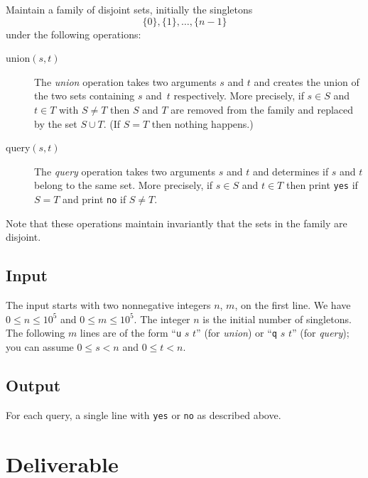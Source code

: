 \documentclass{tufte-handout}
\begin{document}
Maintain a family of disjoint sets, initially the singletons
\[ \{0\},\{1\}, \ldots,\{n-1\} \]
under the following operations:
\begin{description}
  \item[union$(s,t)$]
The \emph{union} operation takes two arguments $s$ and $t$ and creates the union of the two sets containing $s$ and~$t$ respectively.
More precisely, if $s\in S$ and $t\in T$ with $S\neq T$ then $S$ and $T$ are removed from the family and replaced by the set $S\cup T$. 
    (If $S=T$  then nothing happens.)
  \item[query$(s,t)$]
    The \emph{query} operation takes two arguments $s$ and $t$ and determines if $s$ and $t$ belong to the same set.
    More precisely, if $s\in S$ and $t\in T$ then print \texttt{yes} if $S=T$ and print \texttt{no} if $S\neq T$.
\end{description}
Note that these operations maintain invariantly that the sets in the family are disjoint.

\subsection{Input}


The input starts with two nonnegative integers $n$, $m$, on the first line.
We have $0\leq n\leq 10^5$ and $0\leq m\leq 10^5$.
The integer $n$ is the initial number of singletons.
The following $m$ lines are of the form ``\texttt{u} $s$ $t$'' (for \emph{union}) or ``\texttt{q} $s$ $t$'' (for \emph{query}); you can assume $0\leq s< n$ and $0\leq t< n$.

\subsection{Output}


For each query, a single line with \texttt{yes} or \texttt{no} as described above.

\section{Deliverable}
\end{document}
